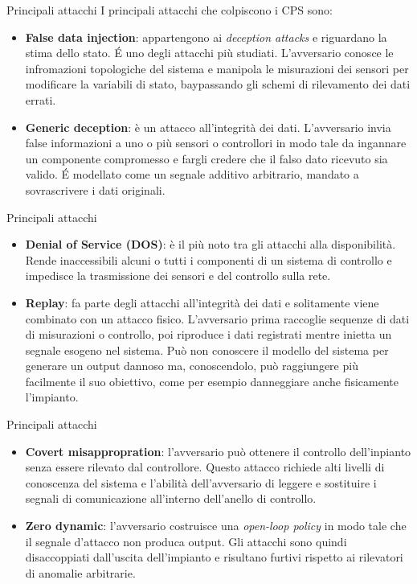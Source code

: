 \documentclass{beamer}
\begin{document}
\begin{frame}{Principali attacchi}
I principali attacchi che colpiscono i CPS sono:
\begin{itemize}
    \item \textbf{False data injection}: appartengono ai \textit{deception attacks} e riguardano la stima dello stato. \'E uno degli attacchi più studiati. 
    L'avversario conosce le infromazioni topologiche del sistema e manipola le misurazioni dei sensori per modificare la variabili di stato, 
    baypassando gli schemi di rilevamento dei dati errati.
    \item \textbf{Generic deception}: è un attacco all'integrità dei dati. L'avversario invia false informazioni a uno o più sensori o controllori 
    in modo tale da ingannare un componente compromesso e fargli credere che il falso dato ricevuto sia valido.
    \'E modellato come un segnale additivo arbitrario, mandato a sovrascrivere i dati originali.
\end{itemize}
\end{frame}

\begin{frame}{Principali attacchi}
\begin{itemize}
    \item \textbf{Denial of Service (DOS)}: è il più noto tra gli attacchi alla disponibilità. Rende inaccessibili alcuni o tutti i componenti di un 
    sistema di controllo e impedisce la trasmissione dei sensori e del controllo sulla rete.
    \item \textbf{Replay}: fa parte degli attacchi all'integrità dei dati e solitamente viene combinato con un attacco fisico. L'avversario prima 
    raccoglie sequenze di dati di misurazioni o controllo, poi riproduce i dati registrati mentre inietta un segnale esogeno nel sistema. 
    Può non conoscere il modello del sistema per generare un output dannoso ma, conoscendolo, può raggiungere più facilmente il suo obiettivo, 
    come per esempio danneggiare anche fisicamente l'impianto.
\end{itemize}
\end{frame}

\begin{frame}{Principali attacchi}
\begin{itemize}
    \item \textbf{Covert misappropration}: l'avversario può ottenere il controllo dell'inpianto senza essere rilevato dal controllore. 
    Questo attacco richiede alti livelli di conoscenza del sistema e l'abilità dell'avversario di leggere e sostituire i segnali di comunicazione  
    all'interno dell'anello di controllo.
    \item \textbf{Zero dynamic}: l'avversario costruisce una \textit{open-loop policy} in modo tale che il segnale d'attacco non produca output. 
    Gli attacchi sono quindi disaccoppiati dall'uscita dell'impianto e risultano furtivi rispetto ai rilevatori di anomalie arbitrarie. 
\end{itemize}
\end{frame}
\end{document}

